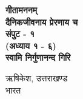 \begin{titlepage}
    \begin{center}
        \vspace*{0.5cm}
            
        {\HUGE
        \textbf{\color{blue}\fontsize{50}{60}\devfont गीतामननम्}}
        \textbf{\\ \devfont \color{black}दैनिकजीवनाय प्रेरणाय च}\\ 
		\vspace{1.0cm}
		\textbf{{\large \devfont\color{black} संपुट - १}\\{\normalsize \devfont\color{black} (अध्याय १ - ६)}}\\		
        \vspace{6.0cm}
        \textbf{{\Large \color{blue}\devfont स्वामि निर्गुणानन्द गिरि}}\\    
        
		
            
        \vfill
            
        
            
        \vspace{0.1cm}
        {\color{black}    
		
		{{\large \devfont\color{blue} ऋषिकेश, उत्तराखण्ड}\\\normalsize भारत}
        }
    \end{center}
\end{titlepage}
\nopagecolor%